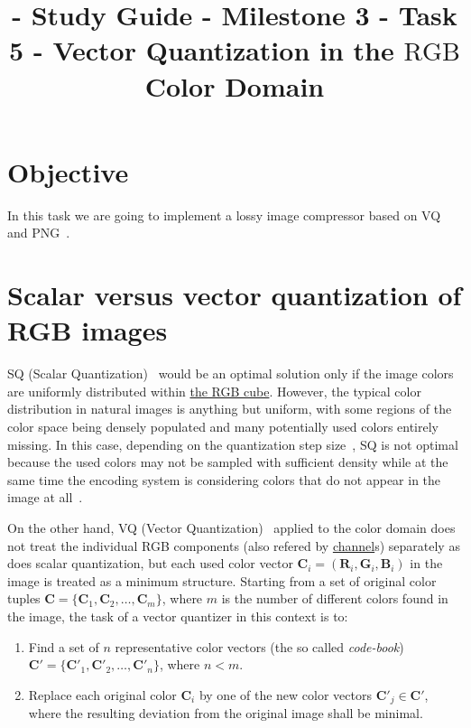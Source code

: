 

\title{\SM{} - Study Guide - Milestone 3 - Task 5 - Vector Quantization in the $\text{RGB}$ Color Domain}

\maketitle

\tableofcontents

\section{Objective}

In this task we are going to implement a lossy image compressor based
on VQ~\cite{vruiz__vector_quantization} and PNG~\cite{vruiz__PNG}.


\section{Scalar versus vector quantization of RGB images}

SQ (Scalar
Quantization)~\cite{vruiz__scalar_quantization,sayood2017introduction}
would be an optimal solution only if the image colors are uniformly
distributed within
\href{https://en.wikipedia.org/wiki/RGB_color_model}{the RGB
  cube}. However, the typical color distribution in natural images is
anything but uniform, with some regions of the color space being
densely populated and many potentially used colors entirely
missing. In this case, depending on the quantization step
size~\cite{vruiz__signal_quantization}, SQ is not optimal because the
used colors may not be sampled with suﬃcient density while at the same
time the encoding system is considering colors that do not appear in
the image at all~\cite{burger2016digital}.

On the other hand, VQ (Vector
Quantization)~\cite{vruiz__vector_quantization,sayood2017introduction}
applied to the color domain does not treat the individual RGB
components (also refered by
\href{https://en.wikipedia.org/wiki/Color_image}{channel}s) separately
as does scalar quantization, but each used color vector ${\mathbf C}_i
= ({\mathbf R}_i, {\mathbf G}_i, {\mathbf B}_i )$ in the image is
treated as a minimum structure. Starting from a set of original color
tuples ${\mathbf C} = \{{\mathbf C}_1, {\mathbf C}_2, \ldots ,{\mathbf
  C}_m\}$, where $m$ is the number of different colors found in the
image, the task of a vector quantizer in this context is to:
\begin{enumerate}
\item Find a set of $n$ representative color vectors (the so called
  \emph{code-book}) ${\mathbf C}' = \{{\mathbf C}'_1, {\mathbf C}'_2
  ,\ldots , {\mathbf C}'_n \}$, where $n < m$.
\item Replace each original color ${\mathbf C}_i$ by one of the new
  color vectors ${\mathbf C}'_j\in {\mathbf C}'$, where the resulting
  deviation from the original image shall be minimal.
\end{enumerate}

